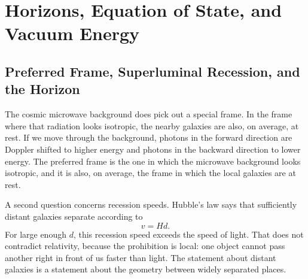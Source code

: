 \chapter{Horizons, Equation of State, and Vacuum Energy}

\section{Preferred Frame, Superluminal Recession, and the Horizon}

The cosmic microwave background does pick out a special frame. In the frame where that radiation looks isotropic, the nearby galaxies are also, on average, at rest. If we move through the background, photons in the forward direction are Doppler shifted to higher energy and photons in the backward direction to lower energy. The preferred frame is the one in which the microwave background looks isotropic, and it is also, on average, the frame in which the local galaxies are at rest.

\begin{classroomqa}
\end{classroomqa}

A second question concerns recession speeds. Hubble's law says that sufficiently distant galaxies separate according to
\begin{equation}
v = H d .
\end{equation}
For large enough \(d\), this recession speed exceeds the speed of light. That does not contradict relativity, because the prohibition is local: one object cannot pass another right in front of us faster than light. The statement about distant galaxies is a statement about the geometry between widely separated places.

\begin{classroomqa}
\end{classroomqa}

